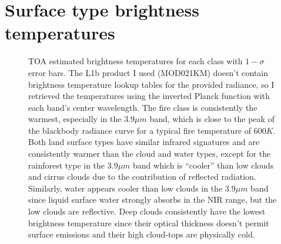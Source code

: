 \documentclass[12pt]{article}
\begin{document}
\clearpage

\section{Surface type brightness temperatures}

\begin{figure}[h!]
    \centering

    \begin{center}
    \end{center}

    \caption{TOA estimated brightness temperatures for each class with $1-\sigma$ error bars. The L1b product I used (MOD021KM) doesn't contain brightness temperature lookup tables for the provided radiance, so I retrieved the temperatures using the inverted Planck function with each band's center wavelength. The fire class is consistently the warmest, especially in the $3.9\mu m$ band, which is close to the peak of the blackbody radiance curve for a typical fire temperature of $600K$. Both land surface types have similar infrared signatures and are consistently warmer than the cloud and water types, except for the rainforest type in the $3.9\mu m$ band which is ``cooler'' than low clouds and cirrus clouds due to the contribution of reflected radiation. Similarly, water appears cooler than low clouds in the $3.9\mu m$ band since liquid surface water strongly absorbs in the NIR range, but the low clouds are reflective. Deep clouds consistently have the lowest brightness temperature since their optical thickness doesn't permit surface emissions and their high cloud-tops are physically cold.}
    \label{p6_temp_dist}
\end{figure}
\end{document}
